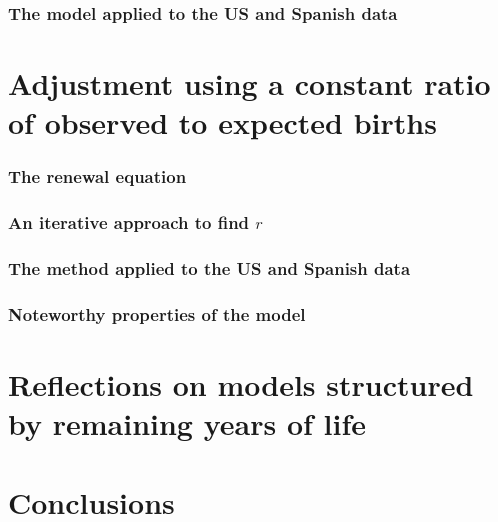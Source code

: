     \subsection{The model applied to the US and Spanish data}
      
  
  
  \chapter{Adjustment using a constant ratio of observed to expected births}
      
    \subsection{The renewal equation}
      
    \subsection{An iterative approach to find $r$}
      
    \subsection{The method applied to the US and Spanish data}
      
    \subsection{Noteworthy properties of the model}
      
  
  \chapter{Reflections on models structured by remaining years of life}
     
  
  \chapter{Conclusions}
    
